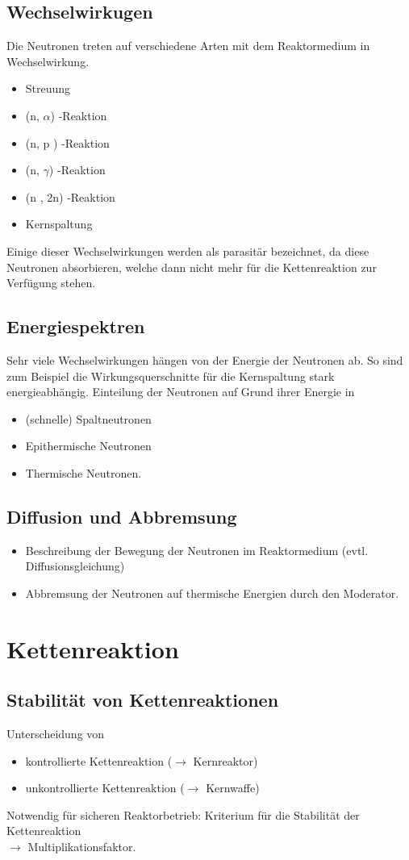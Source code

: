 \documentclass[11pt,a4paper]{article}
\begin{document}
\subsection{Wechselwirkugen}
Die Neutronen treten auf verschiedene Arten mit dem Reaktormedium in Wechselwirkung.
\begin{itemize}
\item Streuung
\item (n, $\alpha$) -Reaktion
\item (n, p ) -Reaktion
\item (n, $\gamma$) -Reaktion
\item (n , 2n) -Reaktion
\item Kernspaltung
\end{itemize}
Einige dieser Wechselwirkungen werden als parasitär bezeichnet, da diese Neutronen absorbieren, welche dann nicht mehr für die Kettenreaktion zur Verfügung stehen.
\subsection{Energiespektren}
Sehr viele Wechselwirkungen hängen von der Energie der Neutronen ab. So sind zum Beispiel die Wirkungsquerschnitte für die Kernspaltung stark energieabhängig. Einteilung der Neutronen auf Grund ihrer  Energie in
\begin{itemize}
\item (schnelle) Spaltneutronen
\item Epithermische Neutronen
\item Thermische Neutronen.
\end{itemize}
\subsection{Diffusion und Abbremsung}
\begin{itemize}
\item Beschreibung der Bewegung der Neutronen im Reaktormedium (evtl. Diffusionsgleichung)
\item Abbremsung der Neutronen auf thermische Energien durch den Moderator.
\end{itemize}
\section{Kettenreaktion}
\subsection{Stabilität von Kettenreaktionen}
Unterscheidung von 
\begin{itemize}
\item kontrollierte Kettenreaktion ($\rightarrow$ Kernreaktor)
\item unkontrollierte Kettenreaktion ($\rightarrow$ Kernwaffe)
\end{itemize}
Notwendig für sicheren Reaktorbetrieb: Kriterium für die Stabilität der Kettenreaktion\\ $\rightarrow$ Multiplikationsfaktor.
\end{document}
